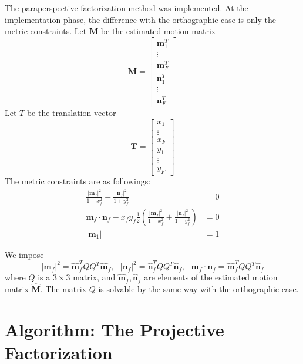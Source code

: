 The paraperspective factorization method \cite{Poelman} was implemented. 
At the implementation phase, the difference with the orthographic case is only the metric constraints. 
Let $ \mathbf{M} $ be the estimated motion matrix
\begin{equation}
\mathbf{M} = \left[ \begin{array}{c}
\mathbf{m}_1^T \\
\vdots \\
\mathbf{m}_F^T \\
\mathbf{n}_1^T \\
\vdots \\
\mathbf{n}_F^T \end{array} \right]
\end{equation}
Let $ T $ be the translation vector
\begin{equation}
\mathbf{T} = \left[ \begin{array}{c}
x_1 \\
\vdots \\
x_F \\
y_1 \\
\vdots \\
y_F \end{array} \right]
\end{equation}
The metric constraints are as followings:
\begin{equation} \begin{array}{cc}
\frac{|\mathbf{m}_f|^2}{1+x_f^2} - \frac{|\mathbf{n}_f|^2}{1+y_f^2} & = 0 \\
 \mathbf{m}_f \cdot \mathbf{n}_f - x_f y_f \frac{1}{2} \left( \frac{|\mathbf{m}_f|^2}{1+x_f^2} + \frac{|\mathbf{n}_f|^2}{1+y_f^2} \right) &= 0 \\
 | \mathbf{m}_1 | &= 1
 \label{parametric}
 \end{array} \end{equation}
  
We impose
$$ |\mathbf{m}_f|^2 = \hat{\mathbf{m}}_f^T Q Q^T \hat{\mathbf{m}}_f, \ \ \ |\mathbf{n}_f|^2 = \hat{\mathbf{n}}_f^T Q Q^T \hat{\mathbf{n}}_f, \ \ \ \mathbf{m}_f \cdot \mathbf{n}_f = \hat{\mathbf{m}}_f^T Q Q^T \hat{\mathbf{n}}_f $$
where $ Q $ is a $ 3 \times 3 $ matrix, and $ \hat{\mathbf{m}}_f, \hat{\mathbf{n}}_f $ are elements of the estimated motion matrix $ \hat{\mathbf{M}}. $
The matrix $ Q $ is solvable by the same way with the orthographic case.

\chapter{Algorithm: The Projective Factorization}

